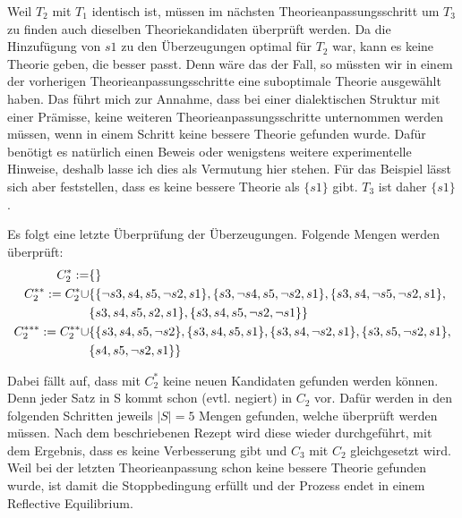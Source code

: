 \documentclass{article}
\begin{document}
 Weil $T_2$ mit $T_1$ identisch ist, müssen im nächsten Theorieanpassungsschritt um $T_3$ zu finden auch dieselben Theoriekandidaten überprüft werden. Da die Hinzufügung von $s1$ zu den Überzeugungen optimal für $T_2$ war, kann es keine Theorie geben, die besser passt. Denn wäre das der Fall, so müssten wir in einem der vorherigen Theorieanpassungsschritte eine suboptimale Theorie ausgewählt haben. Das führt mich zur Annahme, dass bei einer dialektischen Struktur mit einer Prämisse, keine weiteren Theorieanpassungsschritte unternommen werden müssen, wenn in einem Schritt keine bessere Theorie gefunden wurde. Dafür benötigt es natürlich einen Beweis oder wenigstens weitere experimentelle Hinweise, deshalb lasse ich dies als Vermutung hier stehen. Für das Beispiel lässt sich aber feststellen, dass es keine bessere Theorie als $\{s1\}$ gibt. $T_3$ ist daher $\{s1\}$.
 
 Es folgt eine letzte Überprüfung der Überzeugungen. Folgende Mengen werden überprüft:
 \begin{align}
    C_2^{*}:= &\{\}\\
    C_2^{**}:= C_2^{*} \cup &\{\{\neg s3, s4, s5, \neg s2, s1\}, \{s3, \neg s4, s5, \neg s2, s1\}, \{s3, s4, \neg s5, \neg s2, s1\},\\ \notag
    &\{s3, s4, s5, s2, s1\}, \{s3, s4, s5, \neg s2, \neg s1\}\}\\
    C_2^{***}:= C_2^{**} \cup &\{\{s3, s4, s5, \neg s2\}, \{s3, s4, s5, s1\}, \{s3, s4, \neg s2, s1\}, \{s3, s5, \neg s2, s1\},\\ \notag
    &\{s4, s5, \neg s2, s1\}\}
 \end{align}
 
 Dabei fällt auf, dass mit $C_2^{*}$ keine neuen Kandidaten gefunden werden können. Denn jeder Satz in S kommt schon (evtl. negiert) in $C_2$ vor. Dafür werden in den folgenden Schritten jeweils $\lvert S \rvert = 5$ Mengen gefunden, welche überprüft werden müssen.
 Nach dem beschriebenen Rezept wird diese wieder durchgeführt, mit dem Ergebnis, dass es keine Verbesserung gibt und $C_3$ mit $C_2$ gleichgesetzt wird. Weil bei der letzten Theorieanpassung schon keine bessere Theorie gefunden wurde, ist damit die Stoppbedingung erfüllt und der Prozess endet in einem Reflective Equilibrium.
 
\end{document}

